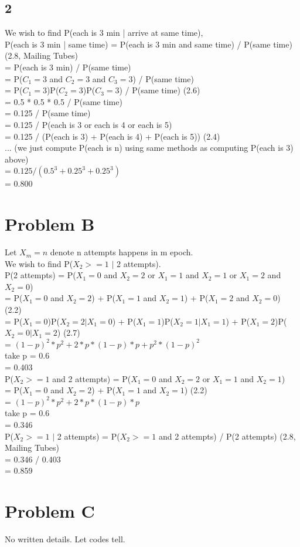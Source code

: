 \documentclass{article}
\begin{document}
\subsection{2}
We wish to find P(each is 3 min | arrive at same time),\\
P(each is 3 min | same time) = P(each is 3 min and same time) / P(same time) (2.8, Mailing Tubes)\\
= P(each is 3 min) / P(same time)\\
= P($C_{1}=3$ and $C_{2}=3$ and $C_{3}=3$) / P(same time)\\
= P($C_{1}=3$)P($C_{2}=3$)P($C_{3}=3$) / P(same time) (2.6)\\
= 0.5 * 0.5 * 0.5 / P(same time)\\
= 0.125 / P(same time)\\
= 0.125 / P(each is 3 or each is 4 or each is 5)\\
= 0.125 / (P(each is 3) + P(each is 4) + P(each is 5)) (2.4)\\
... (we just compute P(each is n) using same methods as computing P(each is 3) above)\\
= $0.125 / (0.5 ^ 3 + 0.25 ^ 3 + 0.25 ^ 3)$\\
= 0.800\\

\section{Problem B}
Let $X_{m}=n$ denote n attempts happens in m epoch.\\
We wish to find P($X_{2}>=1$ $|$ 2 attempts).\\

P(2 attempts) = P($X_{1}=0$ and $X_{2}=2$ or $X_{1}=1$ and $X_{2}=1$ or $X_{1}=2$ and $X_{2}=0$)\\
= P($X_{1}=0$ and $X_{2}=2$) + P($X_{1}=1$ and $X_{2}=1$) + P($X_{1}=2$ and $X_{2}=0$) (2.2)\\
= P($X_{1}=0$)P($X_{2}=2|X_{1}=0$) + P($X_{1}=1$)P($X_{2}=1|X_{1}=1$) + P($X_{1}=2$)P($X_{2}=0|X_{1}=2$) (2.7)\\
= $(1-p)^2*p^2 + 2*p*(1-p)*p + p^2*(1-p)^2$\\
take p = 0.6\\
= 0.403\\

P($X_{2}>=1$ and 2 attempts) = P($X_{1}=0$ and $X_{2}=2$ or $X_{1}=1$ and $X_{2}=1$)\\
= P($X_{1}=0$ and $X_{2}=2$) + P($X_{1}=1$ and $X_{2}=1$) (2.2)\\
= $(1-p)^2*p^2+2*p*(1-p)*p$\\
take p = 0.6\\
= 0.346\\

P($X_{2}>=1$ $|$ 2 attempts) = P($X_{2}>=1$ and 2 attempts) / P(2 attempts) (2.8, Mailing Tubes)\\
= 0.346 / 0.403\\
= 0.859\\

\section{Problem C}
No written details. Let codes tell.
\end{document}
